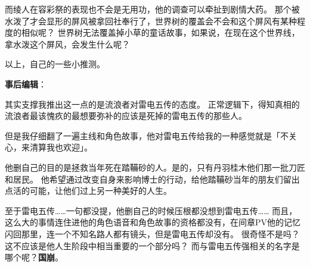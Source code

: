 \begin{multicols*}{2}
	而绫人在容彩祭的表现也不会是无用功，他的调查可以牵扯到剧情大药。
	那个被水泼了才会显形的屏风被拿回社奉行了，世界树的覆盖会不会和这个屏风有某种程度的相似呢？
	世界树无法覆盖掉小草的童话故事，如果说，在现在这个世界线，拿水泼这个屏风，会发生什么呢？

	以上，自己的一些小推测。

	\textbf{事后编辑}：

	其实支撑我推出这一点的是流浪者对雷电五传的态度。
	正常逻辑下，得知真相的流浪者最该愧疚的最想要弥补的应该是死掉的雷电五传的那些人。

	但是我仔细翻了一遍主线和角色故事，他对雷电五传给我的一种感觉就是「不关心，来清算我也欢迎」。

	他删自己的目的是拯救当年死在踏鞴砂的人。是的，只有丹羽桂木他们那一批刀匠和居民。
	他希望通过改变自身来影响博士的行动，给他踏鞴砂当年的朋友们留出点活的可能，让他们过上另一种美好的人生。

	至于雷电五传……一句都没提，他删自己的时候压根都没想到雷电五传……
	而且，这么大的事情连住进他的角色语音和角色故事的资格都没有，在间章PV他的记忆闪回那里，连一个不知名路人都有镜头，但是雷电五传却没有。
	很奇怪不是吗？这不应该是他人生阶段中相当重要的一个部分吗？
	而与雷电五传强相关的名字是哪个呢？\textbf{国崩}。

\end{multicols*}


